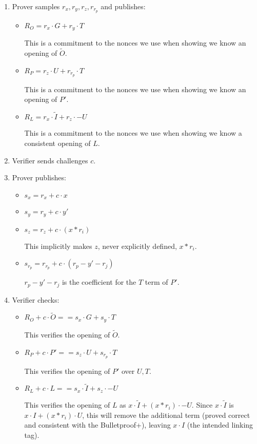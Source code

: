\documentclass[]{article}
\begin{document}
\begin{enumerate}
	\item
	Prover samples $r_x, r_y, r_z, r_{r_p}$ and publishes:
	\begin{itemize}
		\item
		$R_O = r_x \cdot G + r_y \cdot T$
		
		This is a commitment to the nonces we use when showing we know an opening of $\tilde{O}$.
		\item
		$R_P = r_z \cdot U + r_{r_p} \cdot T$
		
		This is a commitment to the nonces we use when showing we know an opening of $P'$.
		\item
		$R_L = r_x \cdot \tilde{I} + r_z \cdot -U$		

		This is a commitment to the nonces we use when showing we know a consistent opening of $L$.
	\end{itemize}
	\item
	Verifier sends challenges $c$.
	\item
	Prover publishes:
	\begin{itemize}
		\item
		$s_x = r_x + c \cdot x$	
		\item
		$s_y = r_y + c \cdot y'$
		\item
		$s_z = r_z + c \cdot (x * r_i)$
		
		This implicitly makes $z$, never explicitly defined, $x * r_i$.
		\item
		$s_{r_p} = r_{r_p} + c \cdot (r_p - y' - r_j)$
		
		$r_p - y' - r_j$ is the coefficient for the $T$ term of $P'$.
	\end{itemize}
	\item
	Verifier checks:
	\begin{itemize}
		\item
		$R_O + c \cdot \tilde{O} == s_x \cdot G + s_y \cdot T$
		
		This verifies the opening of $\tilde{O}$.
		\item
		$R_P + c \cdot P' == s_z \cdot U + s_{r_p} \cdot T$
		
		This verifies the opening of $P'$ over $U, T$.
		\item
		$R_L + c \cdot L == s_x \cdot \tilde{I} + s_z \cdot -U$
		
		This verifies the opening of $L$ as $x \cdot \tilde{I} + (x * r_i) \cdot -U$. Since $x \cdot \tilde{I}$ is $x \cdot I + (x * r_i) \cdot U$, this will remove the additional term (proved correct and consistent with the Bulletproof+), leaving $x \cdot I$ (the intended linking tag).
	\end{itemize}
\end{enumerate}
\end{document}
